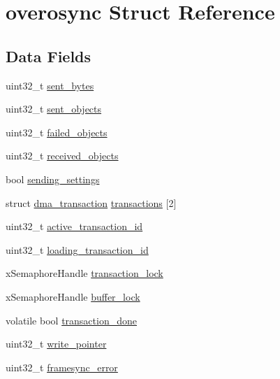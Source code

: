 \hypertarget{structoverosync}{\section{overosync \-Struct \-Reference}
\label{structoverosync}
}
\subsection*{\-Data \-Fields}
\begin{DoxyCompactItemize}
\item 
uint32\-\_\-t \hyperlink{structoverosync_ae75efe9626e6cd54b7f51937d7ccc8bd}{sent\-\_\-bytes}
\item 
uint32\-\_\-t \hyperlink{structoverosync_ace6edc8026e30f605d99e5f01c6d66a9}{sent\-\_\-objects}
\item 
uint32\-\_\-t \hyperlink{structoverosync_aaa5dfd30a46b95fadb58527bc878b2a9}{failed\-\_\-objects}
\item 
uint32\-\_\-t \hyperlink{structoverosync_a44c38abb842382371674de5e2e1b55fe}{received\-\_\-objects}
\item 
bool \hyperlink{structoverosync_a7a7d310f38281bd01857a3a6e818f16e}{sending\-\_\-settings}
\item 
struct \hyperlink{structdma__transaction}{dma\-\_\-transaction} \hyperlink{structoverosync_afb53dc0407f8d5e956d83e78c3b15782}{transactions} \mbox{[}2\mbox{]}
\item 
uint32\-\_\-t \hyperlink{structoverosync_a1d7c514ddaae4ce9d2eb14242df38685}{active\-\_\-transaction\-\_\-id}
\item 
uint32\-\_\-t \hyperlink{structoverosync_a92326e8268b02ad216b020f15bac9342}{loading\-\_\-transaction\-\_\-id}
\item 
x\-Semaphore\-Handle \hyperlink{structoverosync_acca01c899cb020526ac2809ba6b27fc0}{transaction\-\_\-lock}
\item 
x\-Semaphore\-Handle \hyperlink{structoverosync_aa265838f8057c004fdb2e4ef40685434}{buffer\-\_\-lock}
\item 
volatile bool \hyperlink{structoverosync_a065e182f37469dcd89b3de4464d91267}{transaction\-\_\-done}
\item 
uint32\-\_\-t \hyperlink{structoverosync_a094836cef0f9cc8e8b45f8d6a58dc9ad}{write\-\_\-pointer}
\item 
uint32\-\_\-t \hyperlink{structoverosync_a628e392bbafa6a9bdac1085b68fc13bb}{framesync\-\_\-error}
\end{DoxyCompactItemize}



